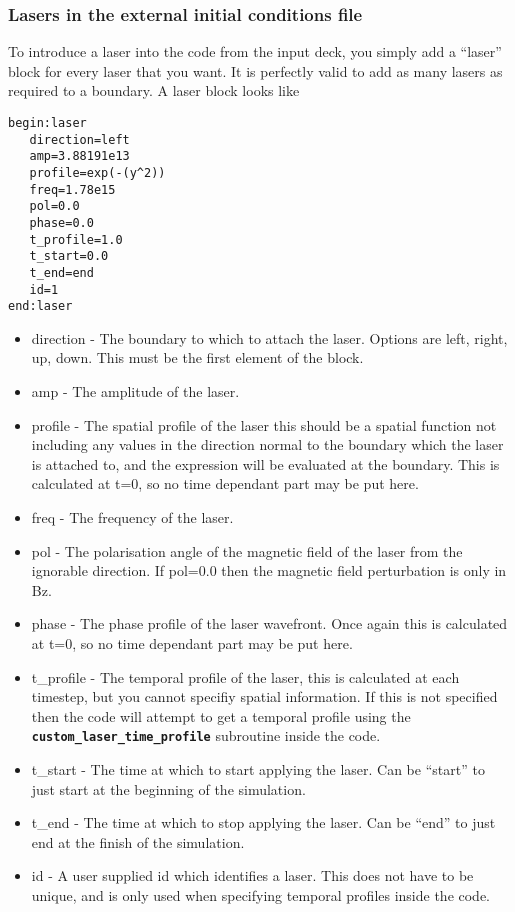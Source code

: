 \documentclass[12pt,a4paper]{article}
\newcommand{\simpleboxverbatim}{\begin{Verbatim}[obeytabs=true,frame=single,
  framerule=0.5mm,rulecolor=\color{warwickmid},formatcom=\color{black}]}
\newcommand{\inlinecode}[1]{{\color{warwickred} \bf\texttt{#1}}}
\begin{document}
\subsubsection{Lasers in the external initial conditions file}
To introduce a laser into the code from the input deck, you simply add a
``laser'' block for every laser that you want. It is perfectly valid to add as
many lasers as required to a boundary. A laser block looks like

\simpleboxverbatim
begin:laser
   direction=left
   amp=3.88191e13
   profile=exp(-(y^2))
   freq=1.78e15
   pol=0.0
   phase=0.0
   t_profile=1.0
   t_start=0.0
   t_end=end
   id=1
end:laser
\end{Verbatim}

\begin{itemize}
\item direction - The boundary to which to attach the laser. Options are left,
  right, up, down. This must be the first element of the block.
\item amp - The amplitude of the laser.
\item profile - The spatial profile of the laser this should be a spatial
  function not including any values in the direction normal to the boundary
  which the laser is attached to, and the expression will be evaluated at the
  boundary. This is calculated at t=0, so no time dependant part may be put
  here.
\item freq - The frequency of the laser.
\item pol - The polarisation angle of the magnetic field of the laser from the
  ignorable direction. If pol=0.0 then the magnetic field perturbation is only
  in Bz.
\item phase - The phase profile of the laser wavefront. Once again this is
  calculated at t=0, so no time dependant part may be put here.
\item t\_profile - The temporal profile of the laser, this is calculated at
  each timestep, but you cannot specifiy spatial information. If this is not
  specified then the code will attempt to get a temporal profile using the
  \inlinecode{custom\_laser\_time\_profile} subroutine inside the code.
\item t\_start - The time at which to start applying the laser. Can be
  ``start'' to just start at the beginning of the simulation.
\item t\_end - The time at which to stop applying the laser. Can be ``end'' to
  just end at the finish of the simulation.
\item id - A user supplied id which identifies a laser. This does not have to
  be unique, and is only used when specifying temporal profiles inside the
  code.
\end{itemize}
\end{document}
